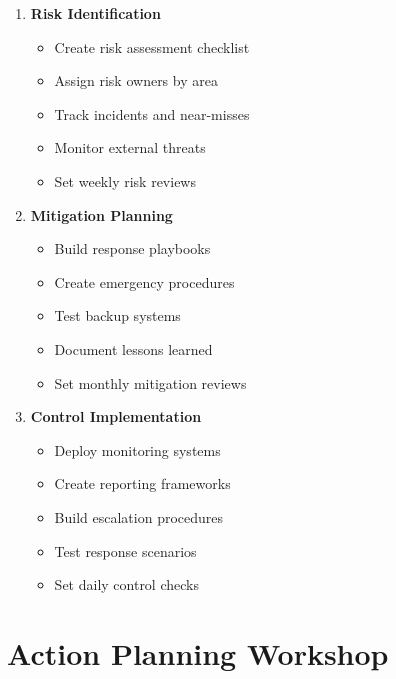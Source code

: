 \begin{tcolorbox}[colback=white,colframe=primarydark,title=\textbf{Risk Management Implementation}]
\begin{enumerate}
    \item \textbf{Risk Identification}
    \begin{itemize}
        \item Create risk assessment checklist
        \item Assign risk owners by area
        \item Track incidents and near-misses
        \item Monitor external threats
        \item Set weekly risk reviews
    \end{itemize}

    \item \textbf{Mitigation Planning}
    \begin{itemize}
        \item Build response playbooks
        \item Create emergency procedures
        \item Test backup systems
        \item Document lessons learned
        \item Set monthly mitigation reviews
    \end{itemize}

    \item \textbf{Control Implementation}
    \begin{itemize}
        \item Deploy monitoring systems
        \item Create reporting frameworks
        \item Build escalation procedures
        \item Test response scenarios
        \item Set daily control checks
    \end{itemize}
\end{enumerate}
\end{tcolorbox}

\section{Action Planning Workshop}\label{sec:action-planning}

